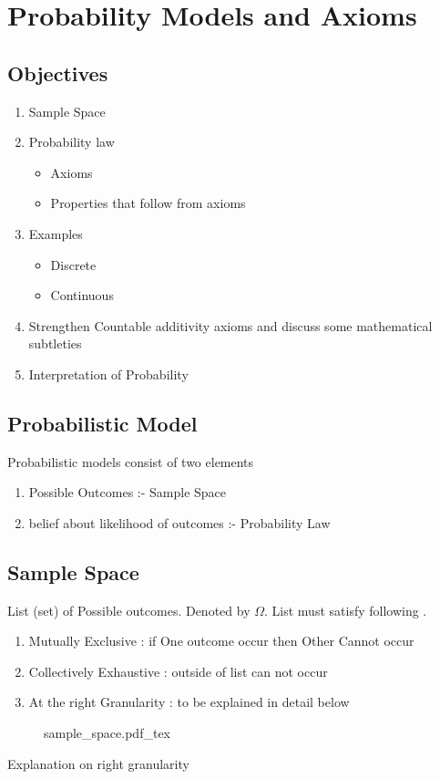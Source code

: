 \section{Probability Models and Axioms}
\subsection{Objectives}
\begin{enumerate}
	\item Sample Space 
	\item  Probability law 
		\begin{itemize}
		    \item Axioms 
		    \item  Properties that follow from axioms
		\end{itemize}
	\item Examples 
		\begin{itemize}
		    \item Discrete 
		    \item Continuous
		\end{itemize}
	\item Strengthen Countable additivity axioms and 
		discuss some mathematical subtleties
	\item  Interpretation of Probability
\end{enumerate}

\subsection{Probabilistic Model}
Probabilistic models consist of two elements 
\begin{enumerate}
    \item Possible Outcomes :- Sample Space
    \item  belief about likelihood of outcomes :- Probability Law
\end{enumerate}

\subsection{Sample Space}
\begin{definition*}
    List (set) of Possible outcomes. Denoted by $\Omega$. List must satisfy following .
    \begin{enumerate}
        \item Mutually Exclusive : if One outcome occur then Other Cannot occur 
	\item Collectively Exhaustive : outside of list can not occur
	\item At the right Granularity : to be explained in detail below 
    \end{enumerate}
\end{definition*}
\begin{figure}[H]
	\centering
	\def\svgwidth{0.3\columnwidth}
	{sample_space.pdf_tex}
\end{figure}
Explanation on right granularity 

